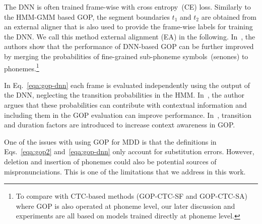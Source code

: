 The DNN is often trained frame-wise with cross entropy~(CE) loss.
Similarly to the HMM-GMM based GOP, the segment boundaries $t_1$ and $t_2$ are obtained from an external aligner that is also used to provide the frame-wise labels for training the DNN.
We call this method external alignment (EA) in the following.
In~\cite{improved_DNN}, the authors show that the performance of DNN-based GOP can be further improved by merging the probabilities of fine-grained sub-phoneme symbols~(senones) to phonemes.\footnote{To compare with CTC-based methods (GOP-CTC-SF and GOP-CTC-SA) where GOP is also operated at phoneme level, our later discussion and experiments are all based on models trained directly at phoneme level.}

In Eq.~\ref{eqa:gop-dnn} each frame is evaluated independently using the output of the DNN, neglecting the transition probabilities in the HMM.
In~\cite{HMM_tran_GOP}, the author argues that these probabilities can contribute with contextual information and including them in the GOP evaluation can improve performance.
In~\cite{context-aware-GOP}, transition and duration factors are introduced to increase context awareness in GOP.

One of the issues with using GOP for MDD is that the definitions in Eqs.~\ref{eqa:gop2} and~\ref{eqa:gop-dnn} only account for substitution errors.
However, deletion and insertion of phonemes could also be potential sources of mispronunciations.
This is one of the limitations that we address in this work.

